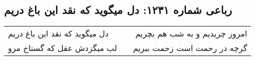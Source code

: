\begin{center}
\section*{رباعی شماره ۱۲۳۱: دل میگوید که نقد این باغ دریم}
\label{sec:1231}
\begin{longtable}{l p{0.5cm} r}
دل میگوید که نقد این باغ دریم
&&
امروز چریدیم و به شب هم بچریم
\\
لب میگزدش عقل که گستاخ مرو
&&
گرچه در رحمت است زحمت ببریم
\\
\end{longtable}
\end{center}
